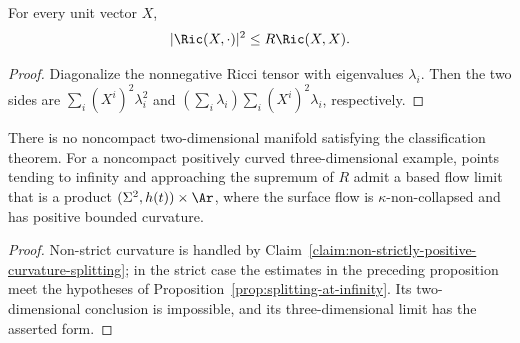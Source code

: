 \begin{claim}\label{claim:ricci-cauchy-schwarz-bound}
For every unit vector $X$,
\[
 |\Ric(X,\cdot)|^2\leq R\Ric(X,X).
\]
\end{claim}
\begin{proof}
\sketch Diagonalize the nonnegative Ricci tensor with eigenvalues
$\lambda_i$. Then the two sides are
$\sum_i(X^i)^2\lambda_i^2$ and
$(\sum_i\lambda_i)\sum_i(X^i)^2\lambda_i$, respectively.
\end{proof}

\begin{corollary}\label{cor:noncompact-soliton-splitting-summary}
\label{compact2Dsol}
There is no noncompact two-dimensional manifold satisfying the
classification theorem. For a noncompact positively curved
three-dimensional example, points tending to infinity and
approaching the supremum of $R$ admit a based flow limit that is a
product $(\Sigma^2,h(t))\times\Ar$, where the surface flow is
$\kappa$-non-collapsed and has positive bounded curvature.
\end{corollary}
\begin{proof}
\sketch Non-strict curvature is handled by
Claim~\ref{claim:non-strictly-positive-curvature-splitting}; in the
strict case the estimates in the preceding proposition meet the
hypotheses of Proposition~\ref{prop:splitting-at-infinity}. Its
two-dimensional conclusion is impossible, and its
three-dimensional limit has the asserted form.
\end{proof}

